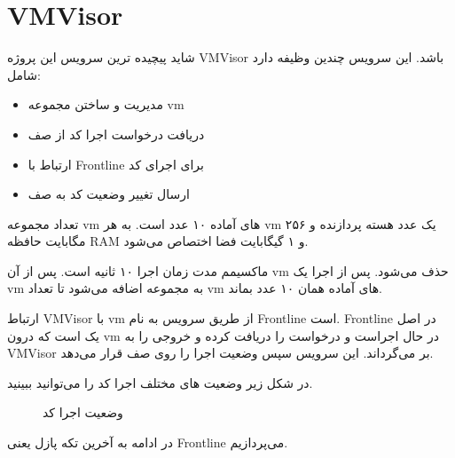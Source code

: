 \section{VMVisor}
شاید پیچیده ترین سرویس این پروژه VMVisor باشد.
این سرویس چندین وظیفه دارد شامل:

\begin{itemize}
    \item مدیریت و ساختن مجموعه vm
    \item دریافت درخواست اجرا کد از صف
    \item ارتباط با Frontline برای اجرای کد
    \item ارسال تغییر وضعیت کد به صف
\end{itemize}

تعداد مجموعه vm های آماده ۱۰ عدد است. به هر vm یک عدد هسته پردازنده و ۲۵۶ مگابایت حافظه RAM و ۱ گیگابایت فضا اختصاص می‌شود.

ماکسیمم مدت زمان اجرا ۱۰ ثانیه است. پس از آن vm حذف می‌شود.
پس از اجرا یک vm به مجموعه اضافه می‌شود تا تعداد vm های آماده همان ۱۰ عدد بماند.

ارتباط VMVisor با vm از طریق سرویس به نام Frontline است.
Frontline در اصل یک  است که درون vm در حال اجراست و درخواست را دریافت کرده و خروجی را به VMVisor بر می‌گرداند.
این سرویس سپس وضعیت اجرا را روی صف قرار می‌دهد.


در شکل زیر وضعیت های مختلف اجرا کد را می‌توانید ببینید.

\begin{figure}[htbp]
    \centering
    \caption{وضعیت اجرا کد}
    \label{fig:job-state}
\end{figure}

در ادامه به آخرین تکه پازل یعنی Frontline می‌پردازیم.
